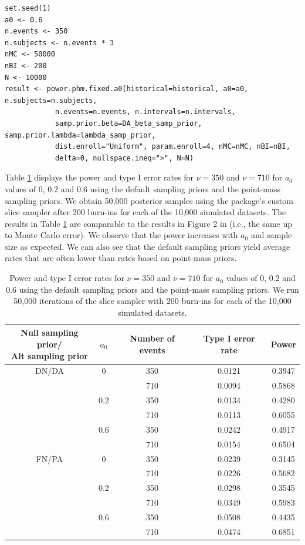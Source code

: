 \begin{verbatim}
set.seed(1)
a0 <- 0.6
n.events <- 350
n.subjects <- n.events * 3
nMC <- 50000
nBI <- 200
N <- 10000
result <- power.phm.fixed.a0(historical=historical, a0=a0, n.subjects=n.subjects, 
            n.events=n.events, n.intervals=n.intervals, 
            samp.prior.beta=DA_beta_samp_prior, samp.prior.lambda=lambda_samp_prior, 
            dist.enroll="Uniform", param.enroll=4, nMC=nMC, nBI=nBI, 
            delta=0, nullspace.ineq=">", N=N)
\end{verbatim}
Table \ref{powers} displays the power and type I error rates for $\nu=350$ and $\nu=710$ for $a_0$ values of $0$, $0.2$ and $0.6$ using the default sampling priors and the point-mass sampling priors. We obtain 50,000 posterior samples using the package's custom slice sampler after 200 burn-ins for each of the 10,000 simulated datasets. The results in Table \ref{powers} are comparable to the results in  Figure 2 in \cite{Psioda_Ibrahim_2019} (i.e., the same up to Monte Carlo error). We observe that the power increases with $a_0$ and sample size as expected. We can also see that the default sampling priors yield average rates that are often lower than rates based on point-mass priors.  

\begin{table}[H]
\centering
\setlength{\extrarowheight}{5pt}
\begin{tabular}{ccccc}
\hline
\thead{Null sampling prior/\\Alt sampling prior} & $a_0$ & Number of events & Type I error rate & Power \\[8pt]
\hline
DN/DA & 0 & 350 & 0.0121 & 0.3947 \\ 
      &   & 710 & 0.0094 & 0.5868 \\ 
	  & 0.2 & 350 & 0.0134 & 0.4280\\
	  &     & 710 & 0.0113 & 0.6055\\
	  & 0.6 & 350 & 0.0242 & 0.4917\\
	  &     & 710 & 0.0154 & 0.6504\\
\hline
FN/PA & 0 & 350 & 0.0239 & 0.3145  \\ 
      &   & 710   & 0.0226 & 0.5682 \\ 
	  & 0.2 & 350 & 0.0298& 0.3545\\
	  &     & 710 & 0.0349& 0.5983\\
	  & 0.6 & 350 & 0.0508& 0.4435\\
	  &     & 710 & 0.0474& 0.6851\\
\hline
\end{tabular}
\caption{Power and type I error rates for $\nu=350$ and $\nu=710$ for $a_0$ values of $0$, $0.2$ and $0.6$ using the default sampling priors and the point-mass sampling priors. We run 50,000 iterations of the slice sampler with 200 burn-ins for each of the 10,000 simulated datasets.}
\label{powers}
\end{table}

